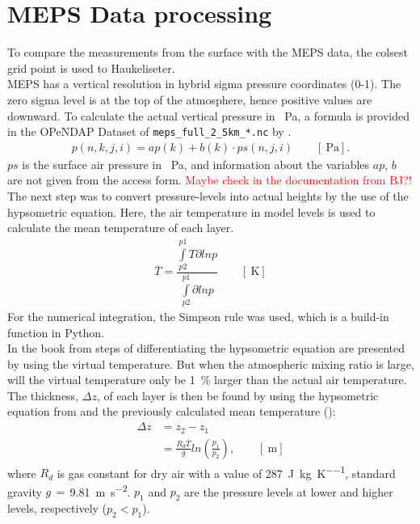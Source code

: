 \section{MEPS Data processing}
\label{sec:MEPS_process}
To compare the measurements from the surface with the MEPS data, the colsest grid point is used to Haukeliseter.
\\
MEPS has a vertical resolution in hybrid sigma pressure coordinates (0-1). The zero sigma level is at the top of the atmosphere, hence positive values are downward. To calculate the actual vertical pressure in \SI{}{\Pa}, a formula is provided in the OPeNDAP Dataset of \texttt{meps\_full\_2\_5km\_*.nc} by \cite{norwegian_meteorological_institute_met_2016}.  
\begin{align}
	p(n,k,j,i) = ap(k) + b(k) \cdot ps(n,j,i) \qquad [\SI{}{\Pa}].
	\label{eq:hybrid_sigma_pressure}
\end{align}
$ps$ is the surface air pressure in \SI{}{\Pa}, and information about the variables $ap$, $b$ are not given from the access form. \textcolor{red}{Maybe check in the documentation from BJ?!}  
\\
The next step was to convert pressure-levels into actual heights by the use of the hypsometric equation. Here, the air temperature in model levels is used to calculate the mean temperature of each layer. 
\begin{align}
	\overline{T} = \dfrac{\int\limits_{p2}^{p1} T \partial ln p}{\int\limits_{p2}^{p1}\partial ln p} \qquad [\SI{}{\kelvin}]
	\label{eq:T_avg}
\end{align}
For the numerical integration, the Simpson rule was used, which is a build-in function in Python. \\
In the book from \cite{martin_mid-latitude_2006} steps of differentiating the hypsometric equation are presented by using the virtual temperature. But when the atmospheric mixing ratio is large, will the virtual temperature only be \SI{1}{\percent} larger than the actual air temperature. 
\\
The thickness, $\Delta z$, of each layer is then be found by using the hypsometric equation from \cite{martin_mid-latitude_2006} and the previously calculated mean temperature ():
\begin{equation}
\begin{split}
\Delta z & = z_2 - z_1 \\
& = \frac{R_d \overline{T}}{g} ln(\frac{p_1}{p_2}), \qquad [\SI{}{\metre}]
\end{split}
\label{eq:hypsometric}
\end{equation}
where $R_d$ is gas constant for dry air with a value of \SI{287}{\joule\per\kilogram\per\kelvin},  standard gravity $g\,=\,$\SI{9.81}{\metre\per\square\second}. $p_1$ and $p_2$ are the pressure levels at lower and higher levels, respectively ($p_2 < p_1$).


